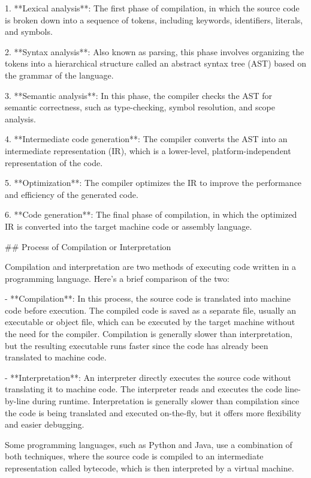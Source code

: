 \documentclass{article}
\begin{document}
1. **Lexical analysis**: The first phase of compilation, in which the source code is broken down into a sequence of tokens, including keywords, identifiers, literals, and symbols.

2. **Syntax analysis**: Also known as parsing, this phase involves organizing the tokens into a hierarchical structure called an abstract syntax tree (AST) based on the grammar of the language.

3. **Semantic analysis**: In this phase, the compiler checks the AST for semantic correctness, such as type-checking, symbol resolution, and scope analysis.

4. **Intermediate code generation**: The compiler converts the AST into an intermediate representation (IR), which is a lower-level, platform-independent representation of the code.

5. **Optimization**: The compiler optimizes the IR to improve the performance and efficiency of the generated code.

6. **Code generation**: The final phase of compilation, in which the optimized IR is converted into the target machine code or assembly language.

## Process of Compilation or Interpretation

Compilation and interpretation are two methods of executing code written in a programming language. Here's a brief comparison of the two:

- **Compilation**: In this process, the source code is translated into machine code before execution. The compiled code is saved as a separate file, usually an executable or object file, which can be executed by the target machine without the need for the compiler. Compilation is generally slower than interpretation, but the resulting executable runs faster since the code has already been translated to machine code.

- **Interpretation**: An interpreter directly executes the source code without translating it to machine code. The interpreter reads and executes the code line-by-line during runtime. Interpretation is generally slower than compilation since the code is being translated and executed on-the-fly, but it offers more flexibility and easier debugging.

Some programming languages, such as Python and Java, use a combination of both techniques, where the source code is compiled to an intermediate representation called bytecode, which is then interpreted by a virtual machine.
\end{document}
